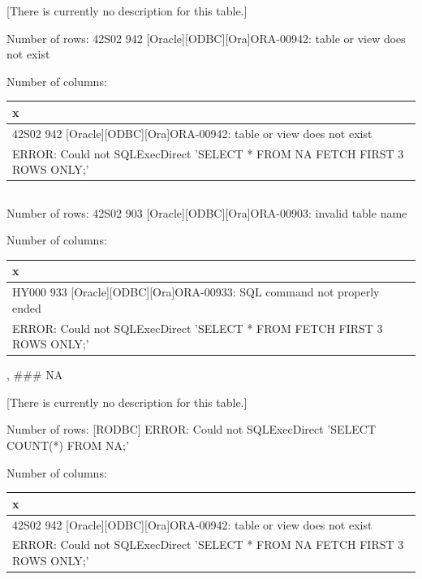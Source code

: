 \documentclass[
  letterpaper,
  oneside,
  open=any]{scrbook}
\begin{document}
{[}There is currently no description for this table.{]}

Number of rows: 42S02 942 {[}Oracle{]}{[}ODBC{]}{[}Ora{]}ORA-00942:
table or view does not exist

Number of columns:

\begin{tabular}{l}
\hline
x\\
\hline
42S02 942 [Oracle][ODBC][Ora]ORA-00942: table or view does not exist\\
\hline
[RODBC] ERROR: Could not SQLExecDirect 'SELECT *
    FROM NA
    FETCH FIRST 3 ROWS ONLY;'\\
\hline
\end{tabular}

\hypertarget{section}{%
\subsection{}\label{section}}

Number of rows: 42S02 903 {[}Oracle{]}{[}ODBC{]}{[}Ora{]}ORA-00903:
invalid table name

Number of columns:

\begin{tabular}{l}
\hline
x\\
\hline
HY000 933 [Oracle][ODBC][Ora]ORA-00933: SQL command not properly ended\\
\hline
[RODBC] ERROR: Could not SQLExecDirect 'SELECT *
    FROM 
    FETCH FIRST 3 ROWS ONLY;'\\
\hline
\end{tabular}

, \#\#\# NA

{[}There is currently no description for this table.{]}

Number of rows: {[}RODBC{]} ERROR: Could not SQLExecDirect 'SELECT
COUNT(*) FROM NA;'

Number of columns:

\begin{tabular}{l}
\hline
x\\
\hline
42S02 942 [Oracle][ODBC][Ora]ORA-00942: table or view does not exist\\
\hline
[RODBC] ERROR: Could not SQLExecDirect 'SELECT *
    FROM NA
    FETCH FIRST 3 ROWS ONLY;'\\
\hline
\end{tabular}

\hypertarget{section-1}{%
\subsection{}\label{section-1}}
\end{document}
